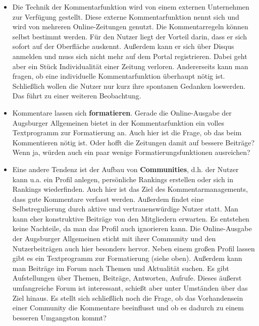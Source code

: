 \begin{itemize}
\item Die Technik der Kommentarfunktion wird von einem externen Unternehmen zur Verfügung gestellt. Diese externe 
Kommentarfunktion nennt sich \grqq\- und wird von mehreren Online-Zeitungen genutzt. Die Kommentarregeln können selbst bestimmt werden. Für den Nutzer liegt der Vorteil darin, dass er sich sofort auf der Oberfläche auskennt. Außerdem kann er sich über Disqus anmelden und muss sich nicht mehr auf dem Portal registrieren. Dabei geht aber ein Stück Individualität einer Zeitung verloren. Andererseits kann man fragen, ob eine individuelle Kommentarfunktion überhaupt nötig ist. Schließlich wollen die Nutzer nur kurz ihre spontanen Gedanken loswerden. Das führt zu einer weiteren Beobachtung. 
\item Kommentare lassen sich {\bfseries formatieren}. Gerade die Online-Ausgabe der Augsburger Allgemeinen bietet in der Kommentarfunktion ein volles Textprogramm zur Formatierung an.  Auch hier ist die Frage, ob das beim Kommentieren nötig ist. Oder hofft die Zeitungen damit auf bessere Beiträge? Wenn ja, würden auch ein paar wenige Formatierungsfunktionen ausreichen? 

\item Eine andere Tendenz ist der Aufbau von {\bfseries Communities}, d.h. der Nutzer kann u.a. ein Profil anlegen, persönliche Rankings erstellen oder sich in Rankings wiederfinden. Auch hier ist das Ziel des Kommentarmanagements, dass gute Kommentare verfasst werden. Außerdem findet eine Selbstregulierung durch aktive und vertrauenswürdige Nutzer statt. Man kann eher konstruktive Beiträge von den Mitgliedern erwarten. Es entstehen keine Nachteile, da man das Profil auch ignorieren kann.
Die Online-Ausgabe der Augsburger Allgemeinen sticht mit ihrer Community und den Nutzerbeiträgen auch hier besonders hervor. Neben einem großen Profil lassen gibt es ein Textprogramm zur Formatierung (siehe oben). Außerdem kann man Beiträge im Forum nach Themen und Aktualität suchen. Es gibt Aufstellungen über Themen, Beiträge, Antworten, Aufrufe. Dieses äußerst umfangreiche Forum ist interessant, schießt aber unter Umständen über das Ziel hinaus. 
Es stellt sich schließlich noch die Frage, ob das Vorhandensein einer Community die Kommentare beeinflusst und ob es dadurch zu einem besseren Umgangston kommt?


\end{itemize}
